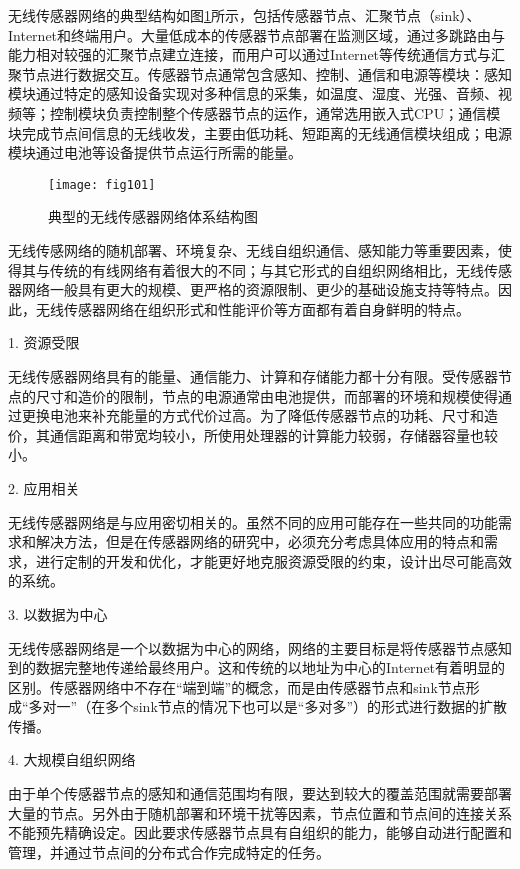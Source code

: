 无线传感器网络的典型结构如图\ref{fig:101}所示，包括传感器节点、汇聚节点（sink）、Internet和终端用户。大量低成本的传感器节点部署在监测区域，通过多跳路由与能力相对较强的汇聚节点建立连接，而用户可以通过Internet等传统通信方式与汇聚节点进行数据交互。传感器节点通常包含感知、控制、通信和电源等模块：感知模块通过特定的感知设备实现对多种信息的采集，如温度、湿度、光强、音频、视频等；控制模块负责控制整个传感器节点的运作，通常选用嵌入式CPU；通信模块完成节点间信息的无线收发，主要由低功耗、短距离的无线通信模块组成；电源模块通过电池等设备提供节点运行所需的能量。
\begin{figure}[t] %
  \centering
  \texttt{[image: fig101]}
  \caption{典型的无线传感器网络体系结构图}
  \label{fig:101}
\end{figure}

无线传感网络的随机部署、环境复杂、无线自组织通信、感知能力等重要因素，使得其与传统的有线网络有着很大的不同；与其它形式的自组织网络相比，无线传感器网络一般具有更大的规模、更严格的资源限制、更少的基础设施支持等特点。因此，无线传感器网络在组织形式和性能评价等方面都有着自身鲜明的特点。

1. 资源受限

无线传感器网络具有的能量、通信能力、计算和存储能力都十分有限。受传感器节点的尺寸和造价的限制，节点的电源通常由电池提供，而部署的环境和规模使得通过更换电池来补充能量的方式代价过高。为了降低传感器节点的功耗、尺寸和造价，其通信距离和带宽均较小，所使用处理器的计算能力较弱，存储器容量也较小。

2. 应用相关

无线传感器网络是与应用密切相关的。虽然不同的应用可能存在一些共同的功能需求和解决方法，但是在传感器网络的研究中，必须充分考虑具体应用的特点和需求，进行定制的开发和优化，才能更好地克服资源受限的约束，设计出尽可能高效的系统。

3. 以数据为中心

无线传感器网络是一个以数据为中心的网络，网络的主要目标是将传感器节点感知到的数据完整地传递给最终用户。这和传统的以地址为中心的Internet有着明显的区别。传感器网络中不存在“端到端”的概念，而是由传感器节点和sink节点形成“多对一”（在多个sink节点的情况下也可以是“多对多”）的形式进行数据的扩散传播。

4. 大规模自组织网络

由于单个传感器节点的感知和通信范围均有限，要达到较大的覆盖范围就需要部署大量的节点。另外由于随机部署和环境干扰等因素，节点位置和节点间的连接关系不能预先精确设定。因此要求传感器节点具有自组织的能力，能够自动进行配置和管理，并通过节点间的分布式合作完成特定的任务。

